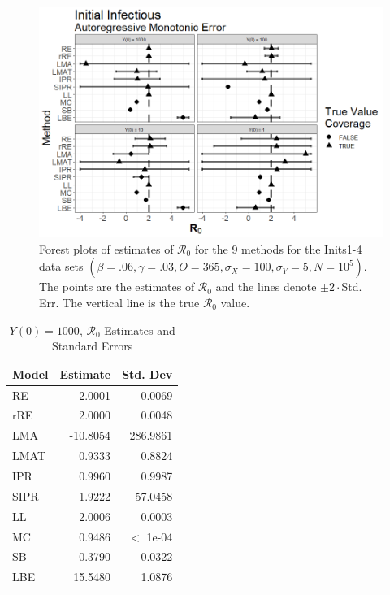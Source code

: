 \documentclass[12pt]{article}
\newcommand{\xxsir}{\ensuremath{9} } %
\newcommand{\rr}{\ensuremath{\mathcal{R}_0}}
\begin{document}
\begin{figure}[H]
	\centering
	\includegraphics[scale=0.5]{images/start_arm.tiff}
	\caption{Forest plots of estimates of $\rr$ for the \xxsir methods for the Inits1-4 data sets $(\beta=.06, \gamma=.03, O=365, \sigma_X=100, \sigma_Y=5, N=10^5)$.  The points are the estimates of $\rr$ and the lines denote $\pm 2\cdot $Std. Err.  The vertical line is the true $\rr$ value.}
\end{figure}


\begin{table}[H]
	
	\centering
	\begin{tabular}[t]{l|r|r}
		\hline
		Model & Estimate & Std. Dev\\
		\hline
		RE & 2.0001 & 0.0069\\
		\hline
		rRE & 2.0000 & 0.0048\\
		\hline
		LMA & -10.8054 & 286.9861\\
		\hline
		LMAT & 0.9333 & 0.8824\\
		\hline
		IPR & 0.9960 & 0.9987\\
		\hline
		SIPR & 1.9222 & 57.0458\\
		\hline
		LL & 2.0006 & 0.0003\\
		\hline
		MC & 0.9486 & $<$ 1e-04\\
		\hline
		SB & 0.3790 & 0.0322\\
		\hline
		LBE & 15.5480 & 1.0876\\
		\hline
	\end{tabular}
	\caption{$Y(0) = 1000$, $\rr$ Estimates and Standard Errors}
\end{table}
\end{document}
